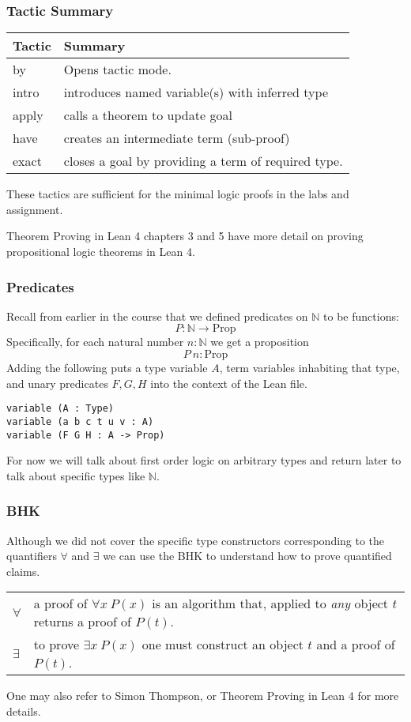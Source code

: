 \documentclass{beamer}
\theoremstyle{indentDefn} \newtheorem{defn}[]{Definition}
\begin{document}
\begin{frame}
	\frametitle{Tactic Summary}
	
	\begin{table}
    		\begin{tabular}{l | l}
			Tactic & Summary \\
			\hline
			by & Opens tactic mode. \\
			intro & introduces named variable(s) with inferred type \\
			apply & calls a theorem to update goal \\
			have & creates an intermediate term (sub-proof) \\
			exact & closes a goal by providing a term of required type.			
		\end{tabular}
	\end{table}
	
	These tactics are sufficient for the minimal logic proofs in the labs and assignment.
	
	Theorem Proving in Lean 4 chapters 3 and 5 have more detail on proving propositional logic theorems in Lean 4.

\end{frame}




\begin{frame}[fragile]
	\frametitle{Predicates}
Recall from earlier in the course that we defined predicates on $\mathbb{N}$ to be functions: 
$$P : \mathbb{N} \to \text{Prop}$$
Specifically, for each natural number $n:\mathbb{N}$ we get a proposition $$P \ n : \text{Prop}$$
Adding the following puts a type variable $A$, term variables inhabiting that type, and unary predicates $F,G,H$ into the context of the Lean file.
\begin{lstlisting}
variable (A : Type)
variable (a b c t u v : A)
variable (F G H : A -> Prop)
\end{lstlisting}
For now we will talk about first order logic on arbitrary types and return later to talk about specific types like $\mathbb{N}$. 
\end{frame}
\begin{frame}
	\frametitle{BHK}
	
	Although we did not cover the specific type constructors corresponding to the quantifiers $\forall$ and $\exists$ we can use the BHK to understand how to prove quantified claims. 	
	\begin{center}
		\begin{tabular}{p{1.5cm}p{8cm}}
		$\forall$ & a proof of $\forall x \ P(x)$ is an algorithm that, applied to \emph{any} object $t$ returns a proof of $P(t)$.\\
		$\exists$ & to prove $\exists x \ P(x)$ one must construct an object $t$ and a proof of $P(t)$. 
		\end{tabular}
	\end{center}
	
	One may also refer to Simon Thompson, or Theorem Proving in Lean 4 for more details. 	
\end{frame}
\end{document}

